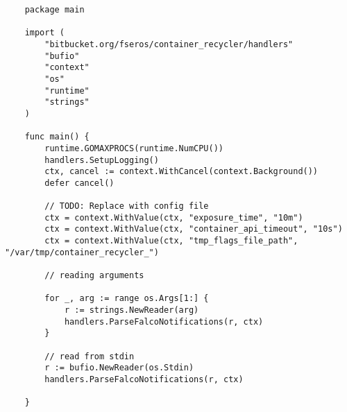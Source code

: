 \begin{verbatim}
    package main
    
    import (
        "bitbucket.org/fseros/container_recycler/handlers"
        "bufio"
        "context"
        "os"
        "runtime"
        "strings"
    )
    
    func main() {
        runtime.GOMAXPROCS(runtime.NumCPU())
        handlers.SetupLogging()
        ctx, cancel := context.WithCancel(context.Background())
        defer cancel()
    
        // TODO: Replace with config file
        ctx = context.WithValue(ctx, "exposure_time", "10m")
        ctx = context.WithValue(ctx, "container_api_timeout", "10s")
        ctx = context.WithValue(ctx, "tmp_flags_file_path", "/var/tmp/container_recycler_")
    
        // reading arguments
    
        for _, arg := range os.Args[1:] {
            r := strings.NewReader(arg)
            handlers.ParseFalcoNotifications(r, ctx)
        }
    
        // read from stdin
        r := bufio.NewReader(os.Stdin)
        handlers.ParseFalcoNotifications(r, ctx)
    
    }
    
\end{verbatim}

